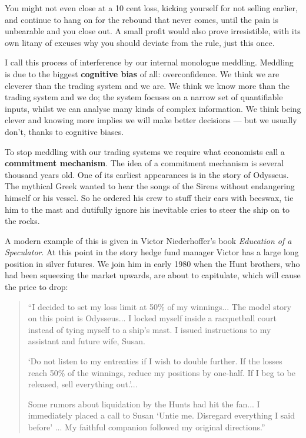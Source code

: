 You might not even close at a 10 cent loss, kicking yourself for not selling earlier, and continue to hang on for the rebound that never comes, until the pain is unbearable and you close out. A small profit would also prove irresistible, with its own litany of excuses why you should deviate from the rule, just this once.

I call this process of interference by our internal monologue meddling. Meddling is due to the biggest \textbf{cognitive bias} of all: overconfidence. We think we are cleverer than the trading system and we are. We think we know more than the trading system and we do; the system focuses on a narrow set of quantifiable inputs, whilst we can analyse many kinds of complex information. We think being clever and knowing more implies we will make better decisions --- but we usually don't, thanks to cognitive biases.

To stop meddling with our trading systems we require what economists call a \textbf{commitment mechanism}. The idea of a commitment mechanism is several thousand years old. One of its earliest appearances is in the story of Odysseus. The mythical Greek wanted to hear the songs of the Sirens without endangering himself or his vessel. So he ordered his crew to stuff their ears with beeswax, tie him to the mast and dutifully ignore his inevitable cries to steer the ship on to the rocks.

A modern example of this is given in Victor Niederhoffer's book \textit{Education of a Speculator}. At this point in the story hedge fund manager Victor has a large long position in silver futures. We join him in early 1980 when the Hunt brothers, who had been squeezing the market upwards, are about to capitulate, which will cause the price to drop:

\begin{quote}
``I decided to set my loss limit at 50\% of my winnings... The model story on this point is Odysseus... I locked myself inside a racquetball court instead of tying myself to a ship's mast. I issued instructions to my assistant and future wife, Susan. 

`Do not listen to my entreaties if I wish to double further. If the losses reach 50\% of the winnings, reduce my positions by one-half. If I beg to be released, sell everything out.'... 

Some rumors about liquidation by the Hunts had hit the fan... I immediately placed a call to Susan `Untie me. Disregard everything I said before' ... My faithful companion followed my original directions.''
\end{quote}

